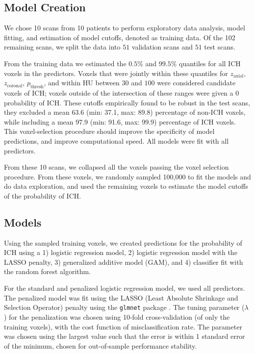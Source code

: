\documentclass{elsarticle_nonatbib}\usepackage[]{graphicx}\usepackage[]{color}
\newcommand{\pkg}[1]{\texttt{#1}}
\begin{document}




\subsection{Model Creation}
We chose 10 scans from 10 patients to perform exploratory data analysis, model fitting, and estimation of model cutoffs, denoted as training data. Of the 102 remaining scans, we split the data into $51$ validation scans and  $51$ test scans.  


From the training data we estimated the $0.5\%$ and $99.5\%$ quantiles for all ICH voxels in the predictors.  Voxels that were jointly within these quantiles for $z_{\text{axial}}$, $z_{\text{coronal}}$, $p_{\text{thresh}}$, and within HU between $30$ and $100$ were considered candidate voxels of ICH; voxels outside of the intersection of these ranges were given a $0$ probability of ICH. These cutoffs empirically found to be robust in the test scans, they excluded a mean 63.6 (min: 37.1, max: 89.8) percentage of non-ICH voxels, while including a mean 97.9 (min: 91.6, max: 99.9) percentage of ICH voxels.  This voxel-selection procedure should improve the specificity of model predictions, and improve computational speed.   All models were fit with all predictors.  

From these 10 scans, we collapsed all the voxels passing the voxel selection procedure.  From these voxels, we randomly sampled  100,000 to fit the models and do data exploration, and used the remaining voxels to estimate the model cutoffs of the probability of ICH.



\subsection{Models}

Using the sampled training voxels, we created predictions for the probability of ICH using a 1) logistic regression model, 2) logistic regression model with the LASSO  penalty, 3) generalized additive model (GAM), and 4) classifier fit with the random forest algorithm.

For the standard and penalized logistic regression model, we used all predictors.  The penalized model was fit using the LASSO (Least Absolute Shrinkage and Selection Operator) penalty \citep{tibshirani_regression_1996} using the \pkg{glmnet} package \citep{friedman_regularization_2010}.  The tuning parameter ($\lambda$) for the penalization was chosen using 10-fold cross-validation (of only the training voxels), with the cost function of misclassification rate.  The parameter was chosen using the largest value such that the error is within 1 standard error of the minimum, chosen for out-of-sample performance stability.
\end{document}
